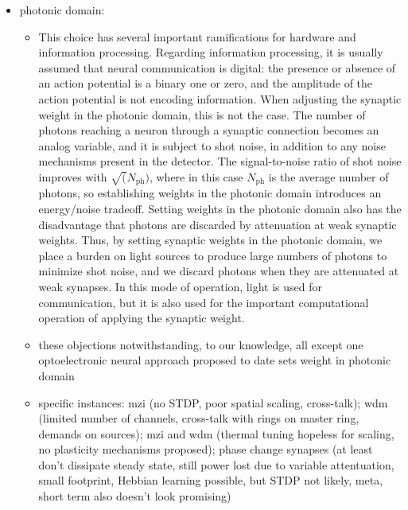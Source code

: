 \begin{itemize}
\item photonic domain:
\begin{itemize}
\item This choice has several important ramifications for hardware and information processing. Regarding information processing, it is usually assumed that neural communication is digital: the presence or absence of an action potential is a binary one or zero, and the amplitude of the action potential is not encoding information. When adjusting the synaptic weight in the photonic domain, this is not the case. The number of photons reaching a neuron through a synaptic connection becomes an analog variable, and it is subject to shot noise, in addition to any noise mechanisms present in the detector. The signal-to-noise ratio of shot noise improves with $\sqrt(N_{\mathrm{ph}})$, where in this case $N_{\mathrm{ph}}$ is the average number of photons, so establishing weights in the photonic domain introduces an energy/noise tradeoff. Setting weights in the photonic domain also has the disadvantage that photons are discarded by attenuation at weak synaptic weights. Thus, by setting synaptic weights in the photonic domain, we place a burden on light sources to produce large numbers of photons to minimize shot noise, and we discard photons when they are attenuated at weak synapses. In this mode of operation, light is used for communication, but it is also used for the important computational operation of applying the synaptic weight.
\item these objections notwithstanding, to our knowledge, all except one optoelectronic neural approach proposed to date sets weight in photonic domain
\item specific instances: mzi (no STDP, poor spatial scaling, cross-talk); wdm (limited number of channels, cross-talk with rings on master ring, demands on sources); mzi and wdm (thermal tuning hopeless for scaling, no plasticity mechanisms proposed); phase change synapses (at least don't dissipate steady state, still power lost due to variable attentuation, small footprint, Hebbian learning possible, but STDP not likely, meta, short term also doesn't look promising)
\end{itemize}


\end{itemize}

